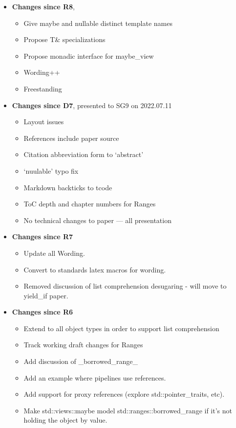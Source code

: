 \documentclass[a4paper,10pt,oneside,openany,final,article]{memoir}
\begin{document}
\begin{itemize}
\item \textbf{Changes since R8},
  \begin{itemize}
  \item Give maybe and nullable distinct template names
  \item Propose T\& specializations
  \item Propose monadic interface for maybe_view
  \item Wording++
  \item Freestanding
  \end{itemize}
\item \textbf{Changes since D7}, presented to SG9 on 2022.07.11
  \begin{itemize}
  \item Layout issues
  \item References include paper source
  \item Citation abbreviation form to `abstract'
  \item `nuulable' typo fix
  \item Markdown backticks to tcode
  \item ToC depth and chapter numbers for Ranges
  \item No technical changes to paper --- all presentation
  \end{itemize}
\item \textbf{Changes since R7}
  \begin{itemize}
  \item Update all Wording.
  \item Convert to standards latex macros for wording.
  \item Removed discussion of list comprehension desugaring - will move to yield_if paper.
  \end{itemize}
\item \textbf{Changes since R6}
  \begin{itemize}
  \item Extend to all object types in order to support list comprehension
  \item Track working draft changes for Ranges
  \item Add discussion of _borrowed_range_
  \item Add an example where pipelines use references.
  \item Add support for proxy references (explore std::pointer_traits, etc).
  \item Make std::views::maybe model std::ranges::borrowed_range if it's not holding the object by value.

\end{itemize}
\end{itemize}
\end{document}

